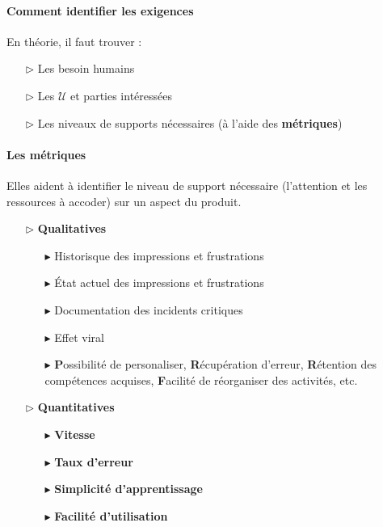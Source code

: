 \documentclass{report}
\begin{document}
\begin{multicols*}{3}
\begin{itemize}
        \paragraph{Comment identifier les exigences}
        En théorie, il faut trouver :

        \begin{itemize}
          \item [$\rhd $] Les besoin humains
          \item [$\rhd $] Les $\mathcal{U}$ et parties intéressées
          \item [$\rhd $] Les niveaux de supports nécessaires
            (à l'aide des \textbf{métriques})
        \end{itemize}

        \paragraph{Les métriques}
        Elles aident à identifier le niveau de support 
        nécessaire (l'attention et les ressources à accoder) 
        sur un aspect du produit. 
        \begin{itemize}
          \item [$\rhd $] \textbf{Qualitatives}  
            \begin{itemize}
              \item [$\blacktriangleright$] 
                Historisque des impressions et frustrations
              \item [$\blacktriangleright$]
                État actuel des impressions et frustrations
              \item [$\blacktriangleright$]
                Documentation des incidents critiques
              \item [$\blacktriangleright$]
                Effet viral
              \item [$\blacktriangleright$]
                \textbf{P}ossibilité de personaliser, 
                \textbf{R}écupération d'erreur, 
                \textbf{R}étention des compétences acquises,     
                \textbf{F}acilité de réorganiser des activités, 
                etc. 
            \end{itemize}
          \item [$\rhd $] \textbf{Quantitatives}  
            \begin{itemize}
               \item [$\blacktriangleright$] 
                 \textbf{Vitesse}               
              \item [$\blacktriangleright$]
                \textbf{Taux d'erreur}  
              \item [$\blacktriangleright$]
                \textbf{Simplicité d'apprentissage}
              \item [$\blacktriangleright$]
                \textbf{Facilité d'utilisation}
            \end{itemize}
        \end{itemize}



\end{itemize}
\end{multicols*}
\end{document}
